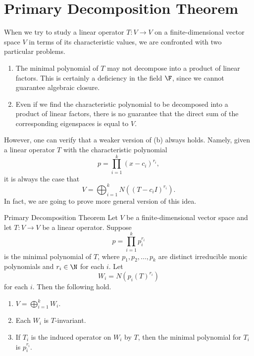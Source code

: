 \documentclass[math_245.tex]{subfiles}
\begin{document}
    \section{Primary Decomposition Theorem}
    
    \begin{remark}
        When we try to study a linear operator $T:V\to V$ on a finite-dimensional vector space $V$ in terms of its characteristic values, we are confronted with two particular problems.
        \begin{enumerate}
            \item The minimal polynomial of $T$ may not decompose into a product of linear factors. This is certainly a deficiency in the field $\F$, since we cannot guarantee algebraic closure. 
            \item Even if we find the characteristic polynomial to be decomposed into a product of linear factors, there is no guarantee that the direct sum of the corresponding eigenspaces is equal to $V$.
        \end{enumerate}
        However, one can verify that a weaker version of (b) always holds. Namely, given a linear operator $T$ with the characteristic polynomial
        \begin{equation*}
            p = \prod^{k}_{i=1} (x-c_i)^{r_i},
        \end{equation*}
        it is always the case that
        \begin{equation*}
            V = \bigoplus^{k}_{i=1} N \left( \left( T-c_iI \right)^{r_i} \right).
        \end{equation*}
        In fact, we are going to prove more general version of this idea.
    \end{remark}

    \begin{theorem}{Primary Decomposition Theorem}
        Let $V$ be a finite-dimensional vector space and let $T:V\to V$ be a linear operator. Suppose
        \begin{equation*}
            p = \prod^{k}_{i=1} p_i^{r_i}
        \end{equation*}
        is the minimal polynomial of $T$, where $p_1, p_2, \ldots, p_k$ are distinct irreducible monic polynomials and $r_i\in \N$ for each $i$. Let
        \begin{equation*}
            W_i = N \left( p_i(T)^{r_i} \right) 
        \end{equation*}
        for each $i$. Then the following hold.
        \begin{enumerate}
            \item $V = \bigoplus^{k}_{i=1} W_i$.
            \item Each $W_i$ is $T$-invariant.
            \item If $T_i$ is the induced operator on $W_i$ by $T$, then the minimal polynomial for $T_i$ is $p_i^{r_i}$.
        \end{enumerate}
    \end{theorem}
\end{document}

